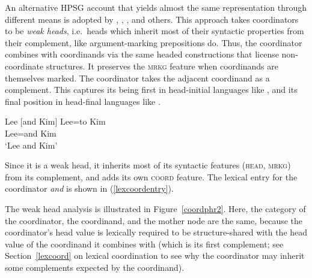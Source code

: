 \begin{sloppypar}
An alternative HPSG account that yields almost the same representation through different means is
adopted by \citet{Abeille:03,Abeille:05}, \citet{Mouret:07}, \citet{Bilbiie:17}, and others. This
approach takes coordinators to be \emph{weak heads}, i.e.\ heads which inherit most of their
syntactic properties from their complement, like argument-marking prepositions do. Thus, the
coordinator combines with coordinands via the same headed constructions that license non-coordinate
structures. It  preserves the \textsc{mrkg} feature when coordinands are themselves marked. The
coordinator takes the adjacent coordinand as a complement. This captures its being first in
head-initial languages like , and its final position in head-final languages like
.
\end{sloppypar}

\eal
\settowidth{}
\ex Lee [and Kim]
\ex 
\gll Lee=to Kim\\
     Lee=and Kim\\
\glt `Lee and Kim'
\zl

\noindent
Since it is a weak head, it inherits most of  its syntactic features (\textsc{head}, \textsc{mrkg}) from its complement, and adds its own  \textsc{coord} feature. The lexical entry for the coordinator \emph{and} is shown in (\ref{lexcoordentry}).

\ea 
{}\label{lexcoordentry}
\z

\noindent
The weak head analysis is illustrated in Figure~\ref{coordphr2}. Here, the category of the
coordinator, the coordinand, and the mother node are the same, because the coordinator's head value
is lexically required to be structure-shared with the head value of the coordinand it combines with
(which is its first complement; see Section~\ref{lexcoord} on lexical coordination to see why the
coordinator may inherit some complements expected by the coordinand). 

